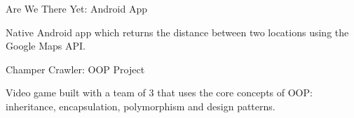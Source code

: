 \begin{cventries}
  \cventry
    {}
    {Are We There Yet: Android App}
    {}
    {}
    {
      \begin{cvitems}
        \item {Native Android app which returns the distance between two locations using the Google Maps API.}
      \end{cvitems}
    }
  \cventry
    {}
    {Champer Crawler: OOP Project}
    {}
    {}
    {
      \begin{cvitems}
        \item {Video game built with a team of 3 that uses the core concepts of OOP: inheritance, encapsulation, polymorphism and design patterns.}
      \end{cvitems}
    }
\end{cventries}

